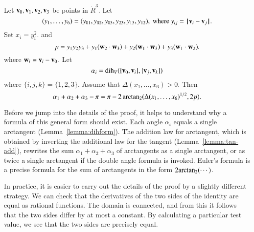 \begin{lemma}\label{lemma:euler} %
Let ${\mathbf v}_0,{\mathbf v}_1,{\mathbf v}_2,{\mathbf v}_3$ be points in $\ring{R}^3$. 
Let 
\[ (y_1,\ldots,y_6)
  =(y_{01},y_{02},y_{03},y_{23},y_{13},y_{12}), \text{ where }
  y_{ij}=\norm{\v_i}{\v_j}.\]  Set $x_i = y_i^2$.  and
\[ 
p = y_1 y_2 y_3 + y_1 ({\mathbf w}_2\cdot {\mathbf w}_3) + y_2 ({\mathbf w}_1\cdot {\mathbf w}_3) + y_3
({\mathbf w}_1\cdot {\mathbf w}_2).
\] 
%
where ${\mathbf w}_i = {\mathbf v}_i- {\mathbf v}_0$.  Let \[ \alpha_i
  =\operatorname{dih}_V(\{{\mathbf v}_0,{\mathbf v}_i\},\{{\mathbf v}_j,{\mathbf v}_k\})\] 
where $\{i,j,k\}=\{1,2,3\}$.
Assume that $\Delta(x_1,\ldots,x_6)>0$. 
Then
\[ 
\alpha_1+\alpha_2+\alpha_3 - \pi
= {\pi} - 2\,{\operatorname{arctan_2}}({\Delta(x_1,\ldots,x_6)^{1/2}},{2 p}).
\] 
\end{lemma}
%


Before we jump into the details of the proof, it helps to understand
why a formula of this general form should exist.  
Each angle $\alpha_i$ equals a single arctangent (Lemma~\ref{lemma:dihform}).
The addition law for arctangent, which is obtained by inverting the additional law for
the tangent (Lemma~\ref{lemma:tan-add}),
rewrites the sum $\alpha_1+\alpha_2+\alpha_3$
of arctangents as a single arctangent, or as twice a single arctangent if
the double angle formula is invoked.  Euler's formula is a precise formula for the
sum of arctangents in the form $2{\operatorname{arctan_2}}(\cdots)$.

In practice, it is easier to carry out the details of the proof by a
slightly different strategy.  We can check that the derivatives of the
two sides of the identity are equal as rational functions.  The domain
is connected, and from this it follows that the two sides differ by at
most a constant.  By calculating a particular test value, we see that
the two sides are precisely equal.



